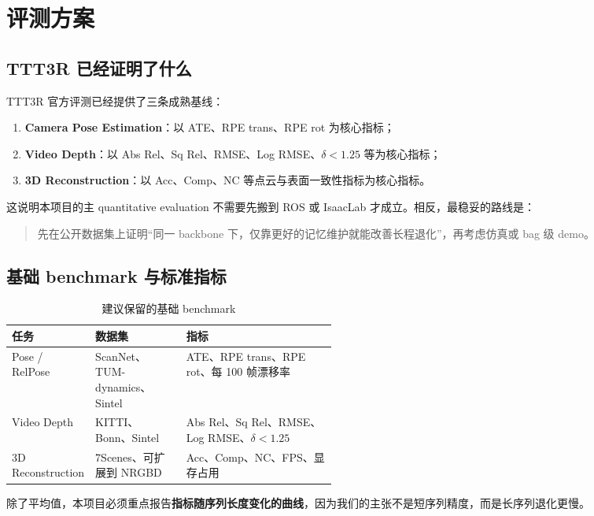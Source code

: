 \documentclass[12pt]{article}
\begin{document}
\section{评测方案}

\subsection{TTT3R 已经证明了什么}

TTT3R 官方评测已经提供了三条成熟基线：
\begin{enumerate}
  \item \textbf{Camera Pose Estimation}：以 ATE、RPE trans、RPE rot 为核心指标；
  \item \textbf{Video Depth}：以 Abs Rel、Sq Rel、RMSE、Log RMSE、$\delta < 1.25$ 等为核心指标；
  \item \textbf{3D Reconstruction}：以 Acc、Comp、NC 等点云与表面一致性指标为核心指标。
\end{enumerate}

这说明本项目的主 quantitative evaluation 不需要先搬到 ROS 或 IsaacLab 才成立。相反，最稳妥的路线是：
\begin{quote}
先在公开数据集上证明“同一 backbone 下，仅靠更好的记忆维护就能改善长程退化”，再考虑仿真或 bag 级 demo。
\end{quote}

\subsection{基础 benchmark 与标准指标}

\begin{table}[H]
\centering
\caption{建议保留的基础 benchmark}
\label{tab:benchmarks}
\begin{tabularx}{\linewidth}{>{\raggedright\arraybackslash}p{0.20\linewidth} >{\raggedright\arraybackslash}p{0.28\linewidth} X}
\toprule
任务 & 数据集 & 指标 \\
\midrule
Pose / RelPose & ScanNet、TUM-dynamics、Sintel & ATE、RPE trans、RPE rot、每 100 帧漂移率 \\
Video Depth & KITTI、Bonn、Sintel & Abs Rel、Sq Rel、RMSE、Log RMSE、$\delta < 1.25$ \\
3D Reconstruction & 7Scenes、可扩展到 NRGBD & Acc、Comp、NC、FPS、显存占用 \\
\bottomrule
\end{tabularx}
\end{table}

除了平均值，本项目必须重点报告\textbf{指标随序列长度变化的曲线}，因为我们的主张不是短序列精度，而是长序列退化更慢。
\end{document}
